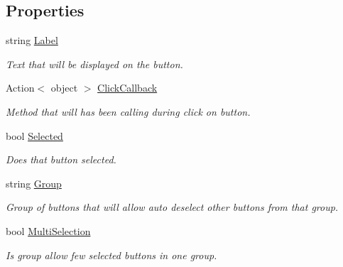 \subsection*{Properties}
\begin{DoxyCompactItemize}
\item 
string \mbox{\hyperlink{class_wpf_handler_1_1_u_i_1_1_controls_1_1_selectable_flat_button_a082859dda84e188a1da2d0e9ba919058}{Label}}
\begin{DoxyCompactList}\small\item\em Text that will be displayed on the button. \end{DoxyCompactList}\item 
Action$<$ object $>$ \mbox{\hyperlink{class_wpf_handler_1_1_u_i_1_1_controls_1_1_selectable_flat_button_a27cd38802c48c61f3b8a230a74669b17}{Click\+Callback}}
\begin{DoxyCompactList}\small\item\em Method that will has been calling during click on button. \end{DoxyCompactList}\item 
bool \mbox{\hyperlink{class_wpf_handler_1_1_u_i_1_1_controls_1_1_selectable_flat_button_ad1ff756964fdb1d04f2ca04a41c67f1c}{Selected}}
\begin{DoxyCompactList}\small\item\em Does that button selected. \end{DoxyCompactList}\item 
string \mbox{\hyperlink{class_wpf_handler_1_1_u_i_1_1_controls_1_1_selectable_flat_button_a2df582128e2ef8858ff4c6f174800b9d}{Group}}
\begin{DoxyCompactList}\small\item\em Group of buttons that will allow auto deselect other buttons from that group. \end{DoxyCompactList}\item 
bool \mbox{\hyperlink{class_wpf_handler_1_1_u_i_1_1_controls_1_1_selectable_flat_button_ac13d0a092b070729c49587c58f050971}{Multi\+Selection}}
\begin{DoxyCompactList}\small\item\em Is group allow few selected buttons in one group. \end{DoxyCompactList}\item 

\end{DoxyCompactItemize}
